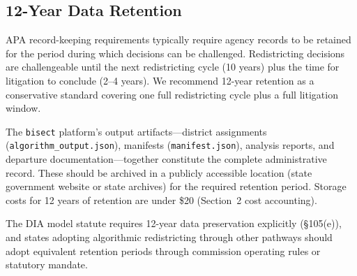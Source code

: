 \subsection{12-Year Data Retention}

APA record-keeping requirements typically require agency records to be retained for the period during which decisions can be challenged. Redistricting decisions are challengeable until the next redistricting cycle (10 years) plus the time for litigation to conclude (2--4 years). We recommend 12-year retention as a conservative standard covering one full redistricting cycle plus a full litigation window.

The \texttt{bisect} platform's output artifacts---district assignments (\texttt{algorithm\_output.json}), manifests (\texttt{manifest.json}), analysis reports, and departure documentation---together constitute the complete administrative record. These should be archived in a publicly accessible location (state government website or state archives) for the required retention period. Storage costs for 12 years of retention are under \$20 (Section~2 cost accounting).

The DIA model statute requires 12-year data preservation explicitly (\S105(e)), and states adopting algorithmic redistricting through other pathways should adopt equivalent retention periods through commission operating rules or statutory mandate.
